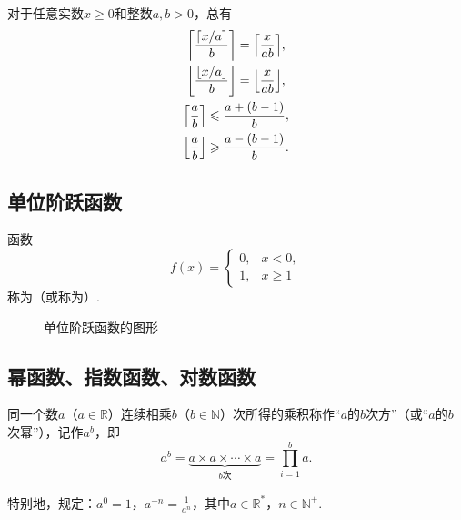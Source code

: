 \begin{property}
对于任意实数\(x \geqslant 0\)和整数\(a,b>0\)，总有\begin{gather}
\ceil*{\frac{\ceil{x/a}}{b}} = \ceil*{\frac{x}{ab}}, \\
\floor*{\frac{\floor{x/a}}{b}} = \floor*{\frac{x}{ab}}, \\
\ceil*{\frac{a}{b}} \leqslant \frac{a+(b-1)}{b}, \\
\floor*{\frac{a}{b}} \geqslant \frac{a-(b-1)}{b}.
\end{gather}
\end{property}

\subsection{单位阶跃函数}
\begin{definition}
函数\[
f(x) = \left\{ \begin{array}{cc}
0, & x < 0, \\
1, & x \geqslant 1
\end{array} \right.
\]称为（或称为）.
\end{definition}

\begin{figure}[h!]
\centering
{}
\caption{单位阶跃函数的图形}
\end{figure}

\subsection{幂函数、指数函数、对数函数}
\begin{definition}
同一个数\(a\)（\(a\in\mathbb{R}\)）连续相乘\(b\)（\(b\in\mathbb{N}\)）次所得的乘积称作“\(a\)的\(b\)次方”（或“\(a\)的\(b\)次幂”），记作\(a^b\)，即\[
a^b = \underbrace{a \times a \times \dotsm \times a}_{b\text{次}} = \prod\limits_{i=1}^b a.
\]

特别地，规定：\(a^0 = 1\)，\(a^{-n} = \frac{1}{a^n}\)，其中\(a\in\mathbb{R}^*\)，\(n\in\mathbb{N}^+\).
\end{definition}

